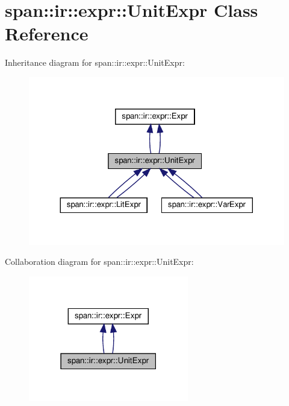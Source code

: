 \hypertarget{classspan_1_1ir_1_1expr_1_1UnitExpr}{}\section{span\+:\+:ir\+:\+:expr\+:\+:Unit\+Expr Class Reference}
\label{classspan_1_1ir_1_1expr_1_1UnitExpr}


Inheritance diagram for span\+:\+:ir\+:\+:expr\+:\+:Unit\+Expr\+:\nopagebreak
\begin{figure}[H]
\begin{center}
\leavevmode
\includegraphics[width=324pt]{classspan_1_1ir_1_1expr_1_1UnitExpr__inherit__graph}
\end{center}
\end{figure}


Collaboration diagram for span\+:\+:ir\+:\+:expr\+:\+:Unit\+Expr\+:\nopagebreak
\begin{figure}[H]
\begin{center}
\leavevmode
\includegraphics[width=198pt]{classspan_1_1ir_1_1expr_1_1UnitExpr__coll__graph}
\end{center}
\end{figure}
